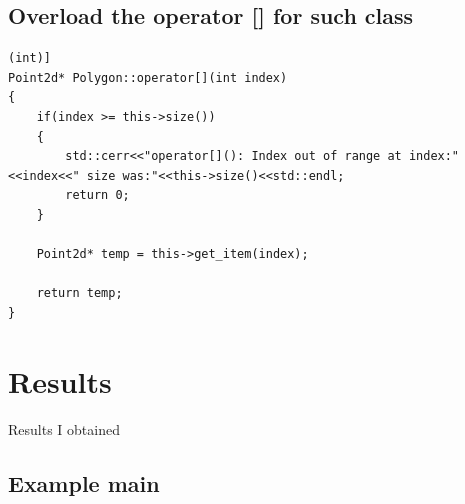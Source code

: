 \documentclass{article}
\begin{document}
		\subsection{Overload the operator [] for such class}
		
\begin{lstlisting}[label=polygon-index_operator,caption=Polygon::operator[](int)]	
Point2d* Polygon::operator[](int index)
{
    if(index >= this->size())
    {
        std::cerr<<"operator[](): Index out of range at index:"<<index<<" size was:"<<this->size()<<std::endl;
        return 0;
    }

    Point2d* temp = this->get_item(index);

    return temp;
}

\end{lstlisting}




\section{Results}
Results I obtained

		\subsection{Example main}
		
\end{document}

